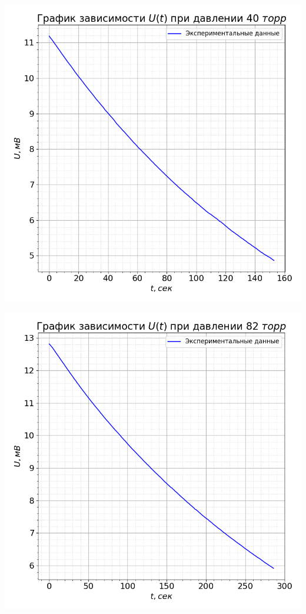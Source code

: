 \documentclass[a4paper, 12pt]{article}
\begin{document}
        \begin{minipage}{0.47\textwidth}
            \includegraphics[width=1\linewidth]{graphs/raw40.png}
        \end{minipage}
        \begin{minipage}{0.47\textwidth}
            \includegraphics[width=1\linewidth]{graphs/raw82.png}
        \end{minipage}
\end{document}
